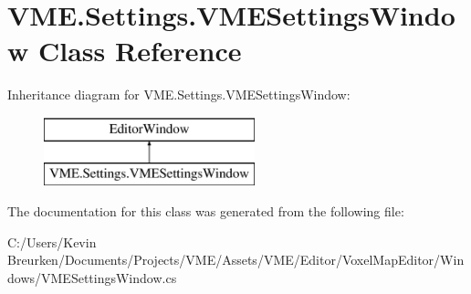 \hypertarget{class_v_m_e_1_1_settings_1_1_v_m_e_settings_window}{}\section{V\+M\+E.\+Settings.\+V\+M\+E\+Settings\+Window Class Reference}
\label{class_v_m_e_1_1_settings_1_1_v_m_e_settings_window}
Inheritance diagram for V\+M\+E.\+Settings.\+V\+M\+E\+Settings\+Window\+:\begin{figure}[H]
\begin{center}
\leavevmode
\includegraphics[height=2.000000cm]{class_v_m_e_1_1_settings_1_1_v_m_e_settings_window}
\end{center}
\end{figure}


The documentation for this class was generated from the following file\+:\begin{DoxyCompactItemize}
\item 
C\+:/\+Users/\+Kevin Breurken/\+Documents/\+Projects/\+V\+M\+E/\+Assets/\+V\+M\+E/\+Editor/\+Voxel\+Map\+Editor/\+Windows/V\+M\+E\+Settings\+Window.\+cs\end{DoxyCompactItemize}
